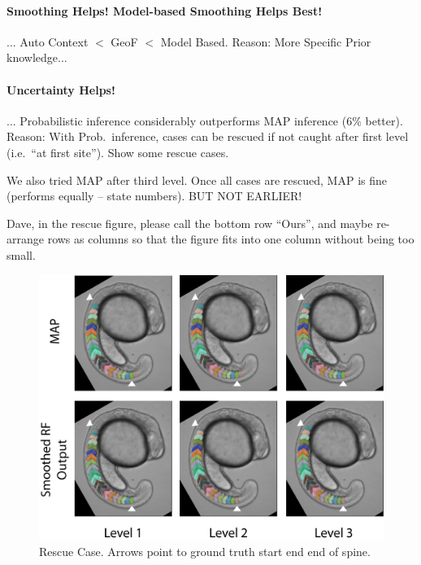 \documentclass[10pt,twocolumn,letterpaper]{article}
\begin{document}
\paragraph{Smoothing Helps! Model-based Smoothing Helps Best!}
... Auto Context $<$ GeoF $<$ Model Based. Reason: More Specific Prior knowledge...

\paragraph{Uncertainty Helps!}
... Probabilistic inference considerably outperforms MAP inference (6\% better). Reason: With Prob.\ inference, cases can be rescued if not caught after first level (i.e.\ "`at first site"'). Show some rescue cases. 

We also tried MAP after third level. Once all cases are rescued, MAP is fine (performs equally -- state numbers). BUT NOT EARLIER!

Dave, in the rescue figure, please call the bottom row "`Ours"', and maybe re-arrange rows as columns so that the figure fits into one column without being too small. 
\begin{figure}[t]
\begin{center}
\includegraphics[width=\columnwidth]{rescue.png} %
\caption{Rescue Case. Arrows point to ground truth start end end of spine. }
\label{fig:rescue}
\end{center}
\end{figure}



{\small


}
\end{document}
